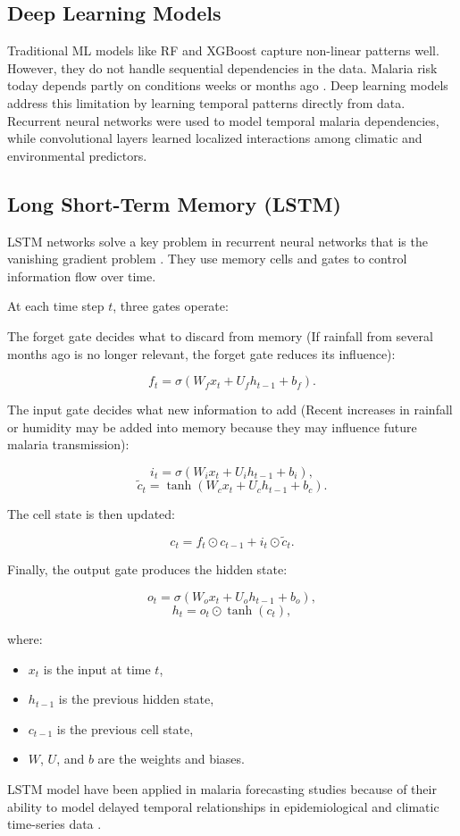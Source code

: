 	
	\subsection{Deep Learning Models}
	
	Traditional ML models like RF and XGBoost capture non-linear patterns well. However, they do not handle sequential dependencies in the data. Malaria risk today depends partly on conditions weeks or months ago \cite{Okundalaye2025Climate-based}. Deep learning models address this limitation by learning temporal patterns directly from data. Recurrent neural networks were used to model temporal malaria dependencies, while convolutional layers learned localized interactions among climatic and environmental predictors.
	
	\subsection{Long Short-Term Memory (LSTM)}
	
	LSTM networks solve a key problem in recurrent neural networks that is the vanishing gradient problem \cite{Okundalaye2025Climate-based}. They use memory cells and gates to control information flow over time.
	
	At each time step \(t\), three gates operate:
	
	The forget gate decides what to discard from memory (If rainfall from several months
	ago is no longer relevant, the forget gate reduces its influence):
	
	\[
	f_t = \sigma(W_f x_t + U_f h_{t-1} + b_f).
	\]
	
	The input gate decides what new information to add (Recent increases in rainfall or
	humidity may be added into memory because they may influence future
	malaria transmission):
	
	\[
	i_t = \sigma(W_i x_t + U_i h_{t-1} + b_i),
	\]
	\[
	\tilde{c}_t = \tanh(W_c x_t + U_c h_{t-1} + b_c).
	\]
	
	The cell state is then updated:
	
	\[
	c_t = f_t \odot c_{t-1} + i_t \odot \tilde{c}_t.
	\]
	
	Finally, the output gate produces the hidden state:
	
	\[
	o_t = \sigma(W_o x_t + U_o h_{t-1} + b_o),
	\]
	\[
	h_t = o_t \odot \tanh(c_t),
	\]
  
  where:
  \begin{itemize}
  	\item $x_t$ is the input at time $t$,
  	\item $h_{t-1}$ is the previous hidden state,
  	\item $c_{t-1}$ is the previous cell state,
  	\item $W$, $U$, and $b$ are the weights and biases.
  \end{itemize}
	 LSTM model have been applied in malaria forecasting studies because of their ability to model delayed temporal relationships in epidemiological and climatic time-series data \cite{Okundalaye2025Climate-based}.
	
